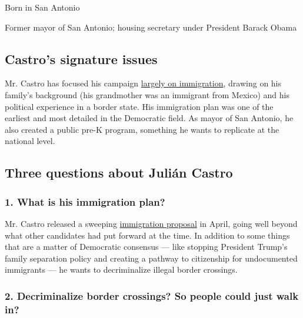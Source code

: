 Born in San Antonio

Former mayor of San Antonio; housing secretary under President Barack
Obama

\hypertarget{castros-signature-issues}{%
\subsection{Castro's signature issues}\label{castros-signature-issues}}

Mr. Castro has focused his campaign
\href{https://www.nytimes3xbfgragh.onion/2019/06/26/us/politics/julian-castro-immigration.html}{largely
on immigration}, drawing on his family's background (his grandmother was
an immigrant from Mexico) and his political experience in a border
state. His immigration plan was one of the earliest and most detailed in
the Democratic field. As mayor of San Antonio, he also created a public
pre-K program, something he wants to replicate at the national level.

\hypertarget{three-questions-about-juliuxe1n-castro}{%
\subsection{Three questions about Julián
Castro}\label{three-questions-about-juliuxe1n-castro}}

\hypertarget{1-what-is-his-immigration-plan}{%
\subsubsection{\texorpdfstring{\textbf{1. What is his immigration
plan?}}{1. What is his immigration plan?}}\label{1-what-is-his-immigration-plan}}

Mr. Castro released a sweeping
\href{https://medium.com/@JulianCastro2020/putting-people-first-e0f765cee00c}{immigration
proposal} in April, going well beyond what other candidates had put
forward at the time. In addition to some things that are a matter of
Democratic consensus --- like stopping President Trump's family
separation policy and creating a pathway to citizenship for undocumented
immigrants --- he wants to decriminalize illegal border crossings.

\hypertarget{2-decriminalize-border-crossings-so-people-could-just-walk-in}{%
\subsubsection{\texorpdfstring{\textbf{2. Decriminalize border
crossings? So people could just walk
in?}}{2. Decriminalize border crossings? So people could just walk in?}}\label{2-decriminalize-border-crossings-so-people-could-just-walk-in}}

